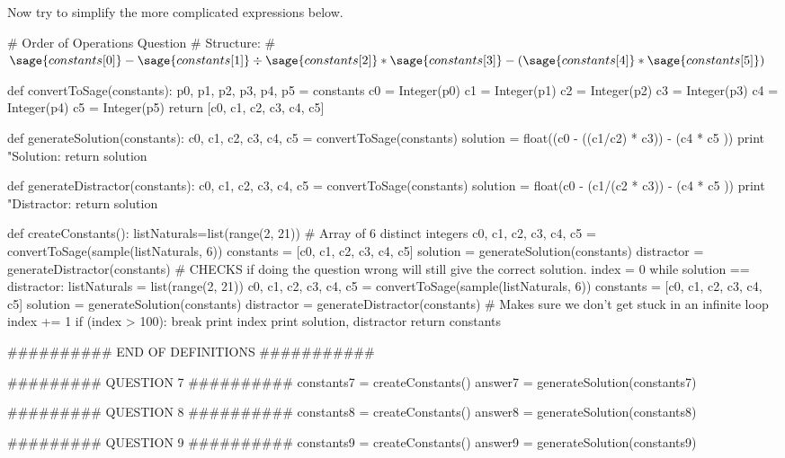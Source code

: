 \documentclass{ximera}
\begin{document}
Now try to simplify the more complicated expressions below.  

\begin{sagesilent}
# Order of Operations Question
# Structure:
    # $\sage{constants[0]} - \sage{constants[1]} \div \sage{constants[2]} * \sage{constants[3]} - (\sage{constants[4]} * \sage{constants[5]})$

def convertToSage(constants):
    p0, p1, p2, p3, p4, p5 = constants
    c0 = Integer(p0)
    c1 = Integer(p1)
    c2 = Integer(p2)
    c3 = Integer(p3)
    c4 = Integer(p4)
    c5 = Integer(p5)
    return [c0, c1, c2, c3, c4, c5]

def generateSolution(constants):
    c0, c1, c2, c3, c4, c5 = convertToSage(constants)
    solution = float((c0 - ((c1/c2) * c3)) - (c4 * c5 ))
    print "Solution: %
    return solution

def generateDistractor(constants):
    c0, c1, c2, c3, c4, c5 = convertToSage(constants)
    solution = float(c0 - (c1/(c2 * c3)) - (c4 * c5 ))
    print "Distractor: %
    return solution

def createConstants():
    listNaturals=list(range(2, 21))
    # Array of 6 distinct integers
    c0, c1, c2, c3, c4, c5 = convertToSage(sample(listNaturals, 6))
    constants = [c0, c1, c2, c3, c4, c5]
    solution = generateSolution(constants)
    distractor = generateDistractor(constants)
    # CHECKS if doing the question wrong will still give the correct solution.
    index = 0
    while solution == distractor:
        listNaturals = list(range(2, 21))
        c0, c1, c2, c3, c4, c5 = convertToSage(sample(listNaturals, 6))
        constants = [c0, c1, c2, c3, c4, c5]
        solution = generateSolution(constants)
        distractor = generateDistractor(constants)
        # Makes sure we don't get stuck in an infinite loop
        index += 1
        if (index > 100):
            break
        print index
    print solution, distractor
    return constants

########## END OF DEFINITIONS ###########

######### QUESTION 7 ##########
constants7 = createConstants()
answer7 = generateSolution(constants7)

######### QUESTION 8 ##########
constants8 = createConstants()
answer8 = generateSolution(constants8)

######### QUESTION 9 ##########
constants9 = createConstants()
answer9 = generateSolution(constants9)

\end{sagesilent}
\end{document}
